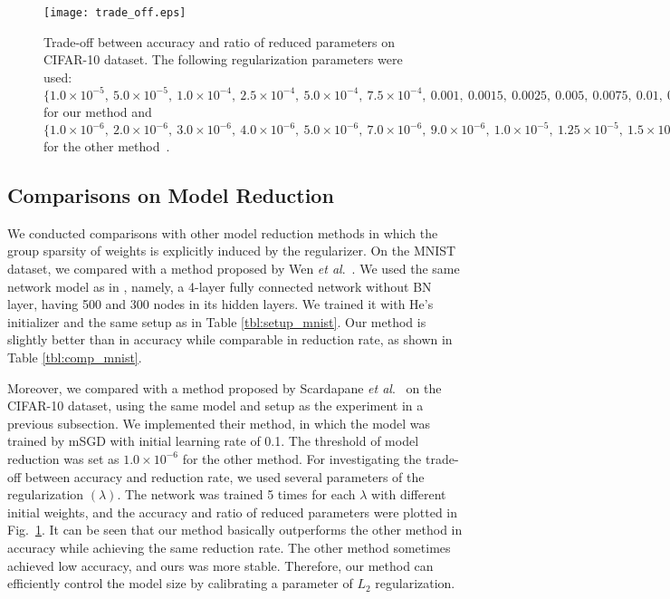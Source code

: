 \documentclass[conference]{IEEEtran}
\newcommand{\etal}{\textit{et al}.}
\begin{document}
\begin{figure}[t] 
	\centerline{\texttt{[image: trade\_off.eps]}}
	\caption{
	Trade-off between accuracy and ratio of reduced parameters on CIFAR-10 dataset. 
	The following regularization parameters were used: 
	$\{1.0\times10^{-5},\>5.0\times10^{-5},\>1.0\times10^{-4},\>2.5\times10^{-4},\>5.0\times10^{-4},\>7.5\times10^{-4},\>0.001,				\>0.0015,			\>0.0025,				\>0.005,			\>0.0075,				\>0.01,				\>0.025,			\>0.05\}$ for our method and 
	$\{1.0\times10^{-6},\>2.0\times10^{-6},\>3.0\times10^{-6},\>4.0\times10^{-6},\>5.0\times10^{-6},\>7.0\times10^{-6},\>9.0\times10^{-6},	\>1.0\times10^{-5},	\>1.25\times10^{-5},	\>1.5\times10^{-5},	\>1.75\times10^{-5},	\>2.0\times10^{-5},	\>3.0\times10^{-5},	\>4.0\times10^{-5}\}$ for the other method~\cite{Scardapane_2017}.
	}
	\label{fig:trade_off_cifar}
\end{figure}

\subsection{Comparisons on Model Reduction}\label{subsec:comp_on_reduction}
We conducted comparisons with other model reduction methods in which the group sparsity of weights is explicitly induced by the regularizer. 
On the MNIST dataset, we compared with a method proposed by Wen \etal~\cite{Wen_2016}. 
We used the same network model as in \cite{Wen_2016}, namely, a 4-layer fully connected network without BN layer, having 500 and 300 nodes in its hidden layers.
We trained it with He's initializer \cite{He_2015} and the same setup as in Table \ref{tbl:setup_mnist}.
Our method is slightly better than \cite{Wen_2016} in accuracy while comparable in reduction rate, as shown in Table \ref{tbl:comp_mnist}. 

Moreover, we compared with a method proposed by Scardapane \etal~\cite{Scardapane_2017} on the CIFAR-10 dataset, using the same model and setup as the experiment in a previous subsection.
We implemented their method, in which the model was trained by mSGD with initial learning rate of 0.1. 
The threshold of model reduction was set as $1.0\times10^{-6}$ for the other method.
For investigating the trade-off between accuracy and reduction rate, we used several parameters of the regularization $(\lambda)$.
The network was trained 5 times for each $\lambda$ with different initial weights, and the accuracy and ratio of reduced parameters were plotted in Fig.~\ref{fig:trade_off_cifar}.
It can be seen that our method basically outperforms the other method in accuracy while achieving the same reduction rate. 
The other method sometimes achieved low accuracy, and ours was more stable.
Therefore, our method can efficiently control the model size by calibrating a parameter of $L_2$ regularization.
\end{document}
